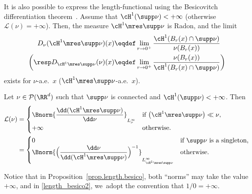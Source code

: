 It is also possible to express the length-functional using the Besicovitch differentiation theorem~\cite[Th.\,2.22]{ambrosio2000functions}. Assume that $\cH^1(\supp \nu)<+\infty$ (otherwise $\mathcal{L}(\nu)=+\infty$). Then, the measure $\cH^1\mres \supp\nu$ is Radon, and the limit
\begin{align}
D_\nu(\cH^1\mres \supp\nu)(x)&\eqdef \lim_{r \to 0^+} \frac{\cH^1(B_r(x)\cap \supp \nu)}{\nu(B_r(x))} \\ \bigg(\mbox{\resp} D_{\cH^1\mres \supp\nu}(\nu)(x)&\eqdef \lim_{r \to 0^+}\frac{\nu(B_r(x))}{\cH^1(B_r(x)\cap \supp \nu)}\bigg)
\end{align}
exists for $\nu$-a.e.\ $x$ (\resp $\cH^1\mres \supp\nu$-a.e.\ $x$).
\begin{proposition}\label{prop.length.besico}
Let $\nu \in \mathcal{P}(\RR^d)$ such that $\supp \nu$ is connected and $\cH^1(\supp \nu)<+\infty$. Then
\begin{align}
\mathcal{L}(\nu) &=
\begin{cases}
\Bnorm{\dfrac{\dd(\cH^1\mres \supp\nu)}{\dd \nu}}_{L^{\infty}_\nu} & \mbox{if $\left(\cH^1\mres \supp \nu\right) \ll \nu$,}\\
+\infty &\mbox{otherwise.}
\end{cases}\label{length_besico1}\\
&=
\begin{cases}
0 & \mbox{if $\supp \nu$ is a singleton,}\\
\Bnorm{\Bigl(\dfrac{\dd \nu}{\dd(\cH^1\mres \supp\nu)}\Bigr)^{-1}}_{L^{\infty}_{\cH^1\mres \supp\nu}} & \mbox{otherwise}.
\end{cases}\label{length_besico2}
\end{align}
\end{proposition}
Notice that in Proposition~\ref{prop.length.besico}, both ``norms'' may take the value $+\infty$, and in \eqref{length_besico2}, we~adopt the convention that $1/0=+\infty$.


